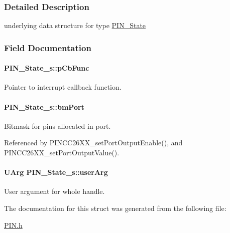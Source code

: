 \subsubsection{Detailed Description}
underlying data structure for type \hyperlink{_p_i_n_8h_a36ef69d50df6baa6973482669c24a522}{P\-I\-N\-\_\-\-State} 

\subsubsection{Field Documentation}
\paragraph[{p\-Cb\-Func}]{ P\-I\-N\-\_\-\-State\-\_\-s\-::p\-Cb\-Func}\label{struct_p_i_n___state__s_a4cae3c3e38b67189531fa4e467b49b2d}


Pointer to interrupt callback function. 

\paragraph[{bm\-Port}]{ P\-I\-N\-\_\-\-State\-\_\-s\-::bm\-Port}\label{struct_p_i_n___state__s_a28cbcd4b8adc0ddbbc14a83cd272574b}


Bitmask for pins allocated in port. 



Referenced by P\-I\-N\-C\-C26\-X\-X\-\_\-set\-Port\-Output\-Enable(), and P\-I\-N\-C\-C26\-X\-X\-\_\-set\-Port\-Output\-Value().

\paragraph[{user\-Arg}]{\setlength{\rightskip}{0pt plus 5cm}U\-Arg P\-I\-N\-\_\-\-State\-\_\-s\-::user\-Arg}\label{struct_p_i_n___state__s_ad999027739394724e799929859d6a61e}


User argument for whole handle. 



The documentation for this struct was generated from the following file\-:\begin{DoxyCompactItemize}
\item 
\hyperlink{_p_i_n_8h}{P\-I\-N.\-h}\end{DoxyCompactItemize}
